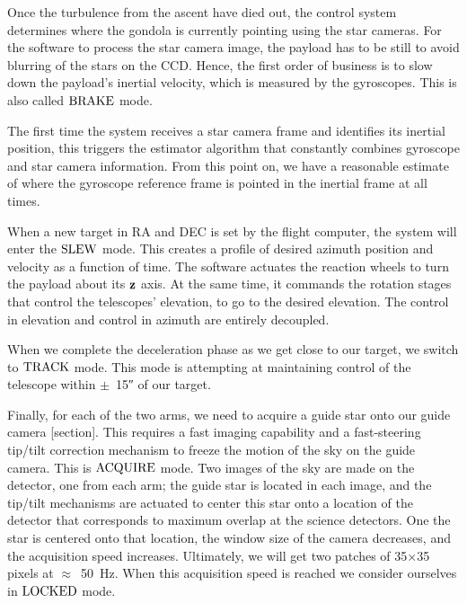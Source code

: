 \begin{figure}[!ht]
	\centering
	
	\caption[Azimuth and elevation of a target]{}
	\label{fig:AzEl}
    \end{figure}


Once the turbulence from the ascent have died out, the control system determines where the gondola is currently pointing using the star cameras. For the software to process the star camera image, the payload has to be still to avoid blurring of the stars on the CCD. Hence, the first order of business is to slow down the payload's inertial velocity, which is measured by the gyroscopes. This is also called $\textrm{BRAKE}$ mode.

The first time the system receives a star camera frame and identifies its inertial position, this triggers the estimator algorithm that constantly combines gyroscope and star camera information. From this point on, we have a reasonable estimate of where the gyroscope reference frame is pointed in the inertial frame at all times. 

When a new target in RA and DEC is set by the flight computer, the system will enter the $\textrm{SLEW}$ mode. This creates a profile of desired azimuth position and velocity as a function of time. The software actuates the reaction wheels to turn the payload about its $\textrm{\textbf{z}}$ axis. At the same time, it commands the rotation stages that control the telescopes' elevation, to go to the desired elevation. The control in elevation and control in azimuth are entirely decoupled.

When we complete the deceleration phase as we get close to our target, we switch to $\textrm{TRACK}$ mode. This mode is attempting at maintaining control of the telescope within $\pm$~\ang{;;15} of our target.

Finally, for each of the two arms, we need to acquire a guide star onto our guide camera [section]. This requires a fast imaging capability and a fast-steering tip/tilt correction mechanism to freeze the motion of the sky on the guide camera. This is $\textrm{ACQUIRE}$ mode. Two images of the sky are made on the detector, one from each arm; the guide star is located in each image, and the tip/tilt mechanisms are actuated to center this star onto a location of the detector that corresponds to maximum overlap at the science detectors. One the star is centered onto that location, the window size of the camera decreases, and the acquisition speed increases. Ultimately, we will get two patches of 35$\times$35 pixels at $\approx$~\SI{50}{\hertz}. When this acquisition speed is reached we consider ourselves in $\textrm{LOCKED}$ mode.

